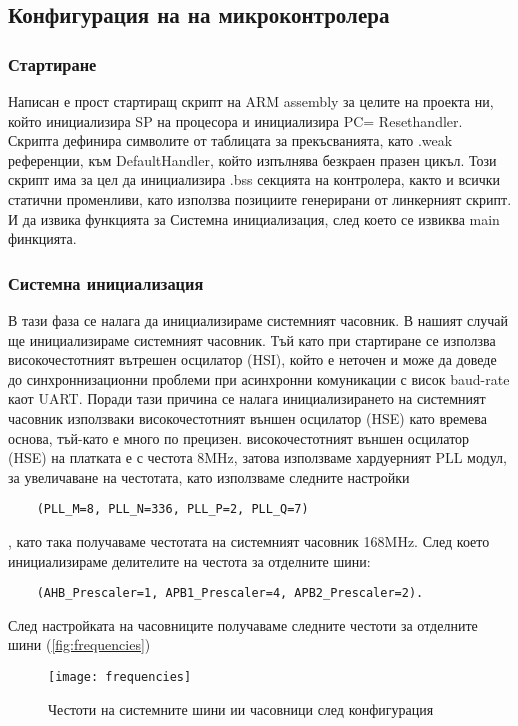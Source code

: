 \subsection{Конфигурация на на микроконтролера}

\subsubsection{Стартиране }

Написан е прост стартиращ скрипт на ARM assembly за целите на проекта ни, който инициализира SP на процесора и инициализира PC= Resethandler.
Скрипта дефинира символите от таблицата за прекъсванията, като .weak референции, към DefaultHandler, който изпълнява безкраен празен цикъл.
Този скрипт има за цел да инициализира .bss секцията на контролера,
както и всички статични променливи, като използва позициите генерирани от линкерният скрипт.
И да извика функцията за Системна инициализация, след което се извиква main финкцията.

\subsubsection{Системна инициализация}

В тази фаза се налага да инициализираме системният часовник.
В нашият случай ще инициализираме системният часовник. 
Тъй като при стартиране се използва високочестотният вътрешен осцилатор (HSI), който е
неточен и може да доведе до синхроннизационни проблеми при асинхронни комуникации 
с висок baud-rate каот UART.
Поради тази причина се налага инициализирането на системният часовник използваки 
високочестотният външен осцилатор (HSE) като времева основа, тъй-като е много по прецизен.
високочестотният външен осцилатор (HSE) на платката е с честота 8MHz, затова използваме
хардуерният PLL модул, за увеличаване на честотата, като използваме следните настройки 
\begin{verbatim}
    (PLL_M=8, PLL_N=336, PLL_P=2, PLL_Q=7)
\end{verbatim}
, като така получаваме честотата на системният часовник 168MHz.
След което инициализираме делителите на честота за отделните шини:
\begin{verbatim}
    (AHB_Prescaler=1, APB1_Prescaler=4, APB2_Prescaler=2).
\end{verbatim}
След настройката на часовниците получаваме следните честоти за отделните шини (\autoref{fig:frequencies})

\begin{figure}[htpb!]
    \centering
    \texttt{[image: frequencies]}
    \caption{Честоти на системните шини ии часовници след конфигурация}
    \label{fig:frequencies}
\end{figure}

